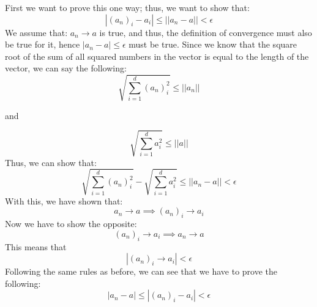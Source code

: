 First we want to prove this one way; thus, we want to show that:
$$
|(a_n)_i -a_i| \leq ||a_n-a|| < \epsilon
$$
We assume that: $a_n \to a$ is true, and thus, the definition of convergence must also be true for it, hence $|a_n-a| \leq \epsilon$ must be true.
Since we know that the square root of the sum of all squared numbers in the vector is equal to the length of the vector, we can say the following:
$$
\sqrt{\sum_{i=1}^{d}(a_n)_i^2} \leq ||a_n||
$$
\begin{center}
and
\end{center}
$$
\sqrt{\sum_{i=1}^{d}a_i^2} \leq ||a||
$$
Thus, we can show that:
$$
\sqrt{\sum_{i=1}^{d}(a_n)_i^2} -\sqrt{\sum_{i=1}^{d}a_i^2} \leq ||a_n-a|| < \epsilon
$$
With this, we have shown that:
$$
a_n \to a \implies (a_n)_i \to a_i
$$
Now we have to show the opposite:
$$
(a_n)_i \to a_i \implies a_n \to a
$$
This means that
$$
|(a_n)_i \to a_i| < \epsilon
$$
Following the same rules as before, we can see that we have to prove the following:
$$
|a_n - a| \leq |(a_n)_i - a_i| < \epsilon
$$